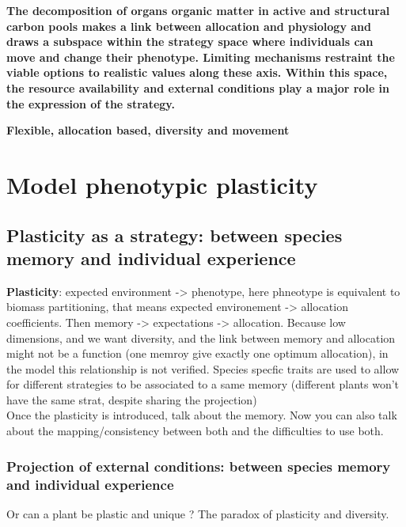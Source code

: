 

\textbf{The decomposition of organs organic matter in active and structural carbon pools makes a link between allocation and physiology and draws a subspace within the strategy space where individuals can move and change their phenotype. Limiting mechanisms restraint the viable options to realistic values along these axis. Within this space, the resource availability and external conditions play a major role in the expression of the strategy.\\ %
}


\textbf{Flexible, allocation based, diversity and movement}

\chapter{Model phenotypic plasticity}


\section{Plasticity as a strategy: between species memory and individual experience}

\textbf{Plasticity}: expected environment -> phenotype, here phneotype is equivalent to biomass partitioning, that means expected environement -> allocation coefficients. Then memory -> expectations -> allocation. Because low dimensions, and we want diversity, and the link between memory and allocation might not be a function (one memroy give exactly one optimum allocation), in the model this relationship is not verified. Species specfic traits are used to allow for different strategies to be associated to a same memory (different plants won't have the same strat, despite sharing the projection)\\
Once the plasticity is introduced, talk about the memory. Now you can also talk about the mapping/consistency between both and the difficulties to use both.


\subsection{Projection of external conditions: between species memory and individual experience}

Or can a plant be plastic and unique ? The paradox of plasticity and diversity.\\


